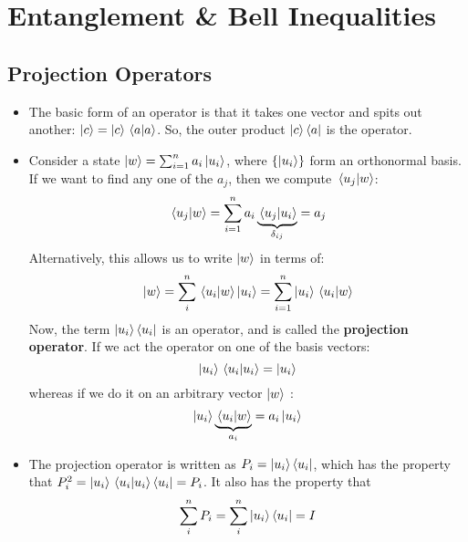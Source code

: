 \section{Entanglement \& Bell Inequalities}
\subsection{Projection Operators}
\begin{itemize}
	\item The basic form of an operator is that it takes one vector and spits out another: \( \ket{c} = \ket{c}
		\braket*{a}{a}\). So, the outer product \( \ket{c}\bra{a} \) is the operator. 
	\item Consider a state \( \ket{w} = \sum_{i=1}^{n}a_i \ket{u_i}\), where \( \{\ket{u_i}\} \) form an orthonormal 
		basis. If we want to find any one of the \( a_j \), then we compute \( \braket*{u_j}{w} \):
		\[
			\braket*{u_j}{w} = \sum_{i = 1}^{n} a_i \underbrace{\braket*{u_j}{u_i}}_{\delta_{ij}} = a_j
		\] 
		Alternatively, this allows us to write \( \ket{w} \) in terms of:
		\[
		\ket{w} = \sum_{i}^{n}\braket*{u_i}{w}\ket{u_i} = \sum_{i = 1}^{n}\ket{u_i}\braket*{u_i}{w}
		\] 
		Now, the term \( \ket{u_i}\bra{u_i} \) is an operator, and is called the \textbf{projection operator}. 
		If we act the operator on one of the basis vectors:
		\[
		\ket{u_i}\braket*{u_i}{u_i} = \ket{u_i}
		\] 
		whereas if we do it on an arbitrary vector \( \ket{w} \) :
		\[
			\ket{u_i}\underbrace{\braket*{u_i}{w}}_{a_i} = a_i \ket{u_i}
		\] 
	\item The projection operator is written as \( P_i = \ket{u_i}\bra{u_i} \), which has the property that 
		\( P_i^2 = \ket{u_i}\braket*{u_i}{u_i}\bra{u_i} = P_i \). It also has the property 
		that 
		\[
			\sum_{i}^{n}P_i = \sum_{i}^{n}\ket{u_i}\bra{u_i} = I
		\] 
\end{itemize}
